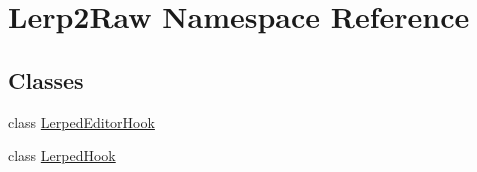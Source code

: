 \hypertarget{namespace_lerp2_raw}{}\section{Lerp2\+Raw Namespace Reference}
\label{namespace_lerp2_raw}
\subsection*{Classes}
\begin{DoxyCompactItemize}
\item 
class \hyperlink{class_lerp2_raw_1_1_lerped_editor_hook}{Lerped\+Editor\+Hook}
\item 
class \hyperlink{class_lerp2_raw_1_1_lerped_hook}{Lerped\+Hook}
\end{DoxyCompactItemize}
